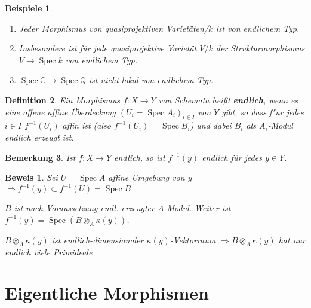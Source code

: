 \documentclass[paper = A4, fontsize=12pt, numbers=noendperiod, chapterprefix=true]{scrbook}
\theoremstyle{break}
\newtheorem{Def}{Definition}[section]
\newtheorem{Bem}[Def]{Bemerkung}
\newtheorem{Bspe}[Def]{Beispiele}
\theoremstyle{nonumberbreak}
\newtheorem{bew}{Beweis}
\theoremstyle{nonumberplain}
\newcommand{\quot}[1]{\textrm{\glqq}{#1}\textrm{\grqq}}
\newcommand{\emp}[1]{\textbf{\emph{#1}}}
\newcommand{\defterm}[1]{{\index{#1}}\emp{#1}}
\DeclareMathOperator{\Spec}{Spec}
\newcommand{\C}{\mathbb{C}}
\newcommand{\Q}{\mathbb{Q}}
\begin{document}
\begin{Bspe}\begin{enumerate}[1)]
\item
	Jeder Morphismus von quasiprojektiven Variet\"aten/$k$ ist von endlichem Typ.
\item
	Insbesondere ist f\"ur jede quasiprojektive Variet\"at $V/k$ der \quot{Strukturmorphismus} $V \to \Spec k$ von endlichem Typ.
\item
	$\Spec \C \to \Spec \Q$ ist nicht lokal von endlichem Typ.
\end{enumerate}\end{Bspe}

\begin{Def}
Ein Morphismus $f: X \to Y$ von Schemata hei\ss t \defterm{endlich}, wenn es eine offene affine \"Uberdeckung $(U_i = \Spec A_i)_{i\in I}$ von $Y$ gibt, so dass f"ur jedes $i \in I$ $f^{-1}(U_i)$ affin ist (also $f^{-1}(U_i) = \Spec B_i$) und dabei $B_i$ als $A_i$-Modul endlich erzeugt ist.
\end{Def}

\begin{Bem}\label{7.6}
Ist $f: X \to Y$ endlich, so ist $f^{-1}(y)$ endlich f\"ur jedes $y \in Y$.
\end{Bem}

\begin{bew}
Sei $U = \Spec A$ affine Umgebung von $y$ $\Rightarrow f^{-1}(y) \subset f^{-1}(U) = \Spec B$

$B$ ist nach Voraussetzung endl. erzeugter $A$-Modul. Weiter ist $f^{-1}(y) = \Spec (B \otimes_A \kappa(y))$.

$B \otimes_A \kappa(y)$ ist endlich-dimensionaler $\kappa(y)$-Vektorraum $\Rightarrow B \otimes_A \kappa(y)$ hat nur endlich viele Primideale
\end{bew}

\newpage


\section{Eigentliche Morphismen}
\end{document}
